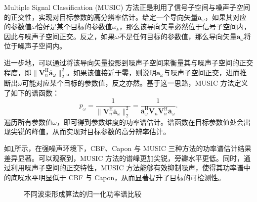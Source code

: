 Multiple Signal Classification (MUSIC) 方法正是利用了信号子空间与噪声子空间的正交性，实现对目标参数的高分辨率估计。给定一个导向矢量\( \bm{a}_{\omega} \)，如果其对应的参数值\( \omega \)恰好是某个目标的参数值\( \omega_k \)，那么该导向矢量必然位于信号子空间内，因此与噪声子空间正交。反之，如果\( \omega \)不是任何目标的参数值，那么导向矢量\( \bm{a}_{\omega} \)将位于噪声子空间内。

进一步地，可以通过将该导向矢量投影到噪声子空间来衡量其与噪声子空间的正交程度，即\( \|\mathbf{V}_{n}^{\mathrm{H}} \overline{\bm{a}}_{\omega}\|_2^2\)。如果该值接近于零，则说明\( \bm{a}_{\omega} \)与噪声子空间正交，进而推断出\( \omega \)可能对应某个目标的参数值，反之亦然。基于这一思路，MUSIC 方法定义了如下的谱函数：
\[
    p_{\omega} = \frac{1}{\|\mathbf{V}_{n}^{\mathrm{H}} \overline{\bm{a}}_{\omega}\|_2^2} = \frac{1}{\overline{\bm{a}}_{\omega}^{\mathrm{H}} \mathbf{V}_{n} \mathbf{V}_{n}^{\mathrm{H}} \overline{\bm{a}}_{\omega}}.
\]
遍历所有参数值\( \omega \)，即可得到参数维度的功率谱估计。谱函数在目标参数值处会出现尖锐的峰值，从而实现对目标参数的高分辨率估计。

如\cref{fig_music_eg}所示，在强噪声环境下，CBF、Capon 与 MUSIC 三种方法的功率谱估计结果差异显著。可以观察到，MUSIC 方法的谱峰更加尖锐，旁瓣水平更低。同时，通过利用噪声子空间的正交特性，MUSIC 方法能够有效抑制噪声，使得其功率谱中的底噪水平明显低于 CBF 与 Capon，从而显著提升了目标的可检测性。
\begin{figure}[htb!]
    \centering
    \caption{不同波束形成算法的归一化功率谱比较}
    \label{fig_music_eg}
\end{figure}

